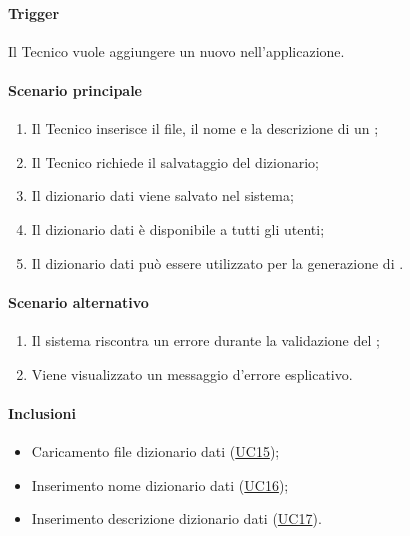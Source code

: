 \paragraph*{Trigger}
Il Tecnico vuole aggiungere un nuovo  nell'applicazione.

\paragraph*{Scenario principale}
\begin{enumerate}
  \item Il Tecnico inserisce il file, il nome e la descrizione di un ;
  \item Il Tecnico richiede il salvataggio del dizionario;
  \item Il dizionario dati viene salvato nel sistema;
  \item Il dizionario dati è disponibile a tutti gli utenti;
  \item Il dizionario dati può essere utilizzato per la generazione di .
\end{enumerate}

\paragraph*{Scenario alternativo}
\begin{enumerate}
  \item Il sistema riscontra un errore durante la validazione del ;
  \item Viene visualizzato un messaggio d'errore esplicativo.
\end{enumerate}

\paragraph*{Inclusioni}
\begin{itemize}
  \item Caricamento file dizionario dati (\hyperref[UC15]{UC15});
  \item Inserimento nome dizionario dati (\hyperref[UC16]{UC16});
  \item Inserimento descrizione dizionario dati (\hyperref[UC17]{UC17}).
\end{itemize}

